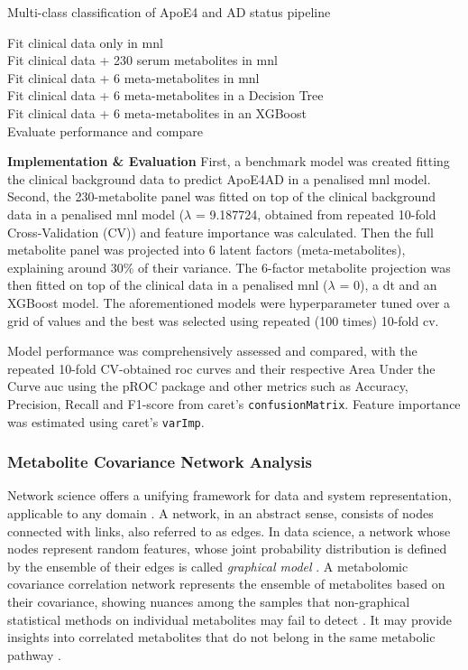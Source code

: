 \documentclass{amsart}
\begin{document}
\begin{algorithm}
\caption{Multi-class classification of ApoE4 and AD status pipeline} \label{alg:classification}
    Fit clinical data only in \acrlong{mnl}\\
    Fit clinical data + 230 serum metabolites in \acrlong{mnl}\\
    Fit clinical data + 6 meta-metabolites in \acrlong{mnl}\\
    Fit clinical data + 6 meta-metabolites in a Decision Tree\\
    Fit clinical data + 6 meta-metabolites in an XGBoost\\
    Evaluate performance and compare
\end{algorithm}

\leavevmode\newline \textbf{Implementation \& Evaluation}\hspace{.25cm} First, a benchmark model was created fitting the clinical background data to predict ApoE4AD in a penalised \acrlong{mnl} model. Second, the 230-metabolite panel was fitted on top of the clinical background data in a penalised \acrlong{mnl} model ($\lambda$ = 9.187724, obtained from repeated 10-fold Cross-Validation (CV)) and feature importance was calculated. Then the full metabolite panel was projected into 6 latent factors (meta-metabolites), explaining around 30\% of their variance. The 6-factor metabolite projection was then fitted on top of the clinical data in a penalised \acrlong{mnl} ($\lambda$ = 0), a \acrlong{dt} and an XGBoost model. The aforementioned models were hyperparameter tuned over a grid of values and the best was selected using repeated (100 times) 10-fold \acrshort{cv}. 

Model performance was comprehensively assessed and compared, with the repeated 10-fold CV-obtained \acrfull{roc} curves and their respective Area Under the Curve \acrshort{auc} using the \textsf{pROC} package \cite{pROC} and other metrics such as Accuracy, Precision, Recall and F1-score from \textsf{caret}'s \texttt{confusionMatrix}. Feature importance was estimated using \textsf{caret}'s \texttt{varImp}.

\subsubsection{Metabolite Covariance Network Analysis}\label{rq3}
Network science offers a unifying framework for data and system representation, applicable to any domain \cite{Barabasi2015NetworkScience}. A network, in an abstract sense, consists of nodes connected with links, also referred to as edges. In data science, a network whose nodes represent random features, whose joint probability distribution is defined by the ensemble of their edges is called \textit{graphical model} \cite{Peeters2022Rags2ridges:Matrices}. A metabolomic covariance correlation network represents the ensemble of metabolites based on their covariance, showing nuances among the samples that non-graphical statistical methods on individual metabolites may fail to detect \cite{PerezDeSouza2020Network-basedInterpretation}. It may provide insights into correlated metabolites that do not belong in the same metabolic pathway \cite{PerezDeSouza2020Network-basedInterpretation}.
\end{document}
